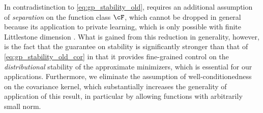 In contradistinction to \eqref{eq:gp_stability_old},  requires an additional assumption of \emph{separation} on the function class $\cF$, which cannot be dropped in general because its application to private learning, which is only possible with finite Littlestone dimension \citep{AlonLMM19}.  What is gained from this reduction in generality, however, is the fact that the guarantee on stability is significantly stronger than that of \eqref{eq:gp_stability_old_cor} in that it provides fine-grained control on the \emph{distributional} stability of the approximate minimizers, which is essential for our applications.  Furthermore, we eliminate the assumption of well-conditionedness on the covariance kernel, which substantially increases the generality of application of this result, in particular by allowing functions with arbitrarily small norm.

